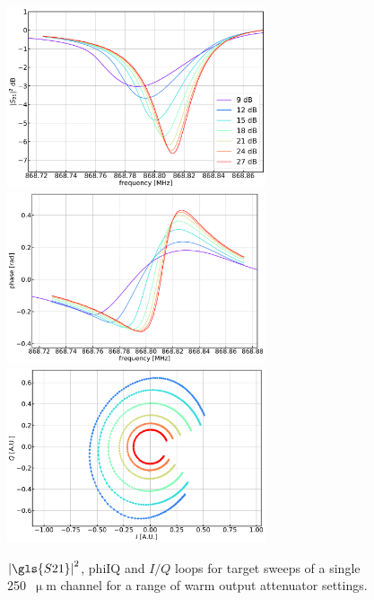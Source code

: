 \begin{figure}[!ptbh]
\centering
\caption[~Sweeps at different tone powers for a single resonator.]{$\left| \gls{S21} \right|^{2}$, \gls{phiIQ} and $I/Q$ loops for target sweeps of a single 250~$\upmu$m channel for a range of warm output attenuator settings.}
\includegraphics[width=0.68\textwidth]{figures/blast_data/sweeps/mag_tone_power_may}
\includegraphics[width=0.68\textwidth]{figures/blast_data/sweeps/phase_tone_power_may}
\includegraphics[width=0.68\textwidth]{figures/blast_data/sweeps/IQ_tone_power_may}
\label{fig:may out atten}
\end{figure}

